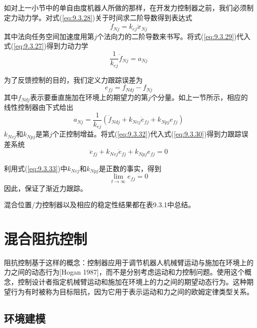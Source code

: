 \documentclass[12pt,a4paper]{ctexart}
\begin{document}
如对上一小节中的单自由度机器人所做的那样，在开发力控制器之前，我们必须制定力动力学。对式(\ref{eq:9.3.28})关于时间求二阶导数得到表达式
\begin{equation}\label{eq:9.3.29}
\ddot{f}_{Nj} = k_{ej}\ddot{x}_{Nj}
\end{equation}
其中法向任务空间加速度用第$j$个法向力的二阶导数来书写。将式(\ref{eq:9.3.29})代入式(\ref{eq:9.3.27})得到力动力学
\begin{equation}\label{eq:9.3.30}
\frac{1}{k_{ej}}\ddot{f}_{Nj} = a_{Nj}
\end{equation}

为了反馈控制的目的，我们定义力跟踪误差为
\begin{equation}\label{eq:9.3.31}
e_{fj} = f_{Ndj} - f_{Nj}
\end{equation}
其中$f_{Ndj}$表示要垂直施加在环境上的期望力的第$j$个分量。如上一节所示，相应的线性控制器由下式给出
\begin{equation}\label{eq:9.3.32}
a_{Nj} = \frac{1}{k_{ej}}(\ddot{f}_{Ndj} + k_{Nvj}\dot{e}_{fj} + k_{Npj}e_{fj})
\end{equation}
$k_{Nvj}$和$k_{Npj}$是第$j$个正控制增益。将式(\ref{eq:9.3.32})代入式(\ref{eq:9.3.30})得到力跟踪误差系统
\begin{equation}\label{eq:9.3.33}
\ddot{e}_{fj} + k_{Nvj}\dot{e}_{fj} + k_{Npj}e_{fj} = 0
\end{equation}

利用式(\ref{eq:9.3.33})中$k_{Nvj}$和$k_{Npj}$是正数的事实，得到
\[
\lim_{t \to \infty} e_{fj} = 0
\]
因此，保证了渐近力跟踪。

混合位置/力控制器以及相应的稳定性结果都在表9.3.1中总结。

\section{混合阻抗控制}\label{sec:9.4}

阻抗控制基于这样的概念：控制器应用于调节机器人机械臂运动与施加在环境上的力之间的动态行为[Hogan 1987]，而不是分别考虑运动和力控制问题。使用这个概念，控制设计者指定机械臂运动和施加在环境上的力之间的期望动态行为。这种期望行为有时被称为目标阻抗，因为它用于表示运动和力之间的欧姆定律类型关系。

\subsection{环境建模}
\end{document}
